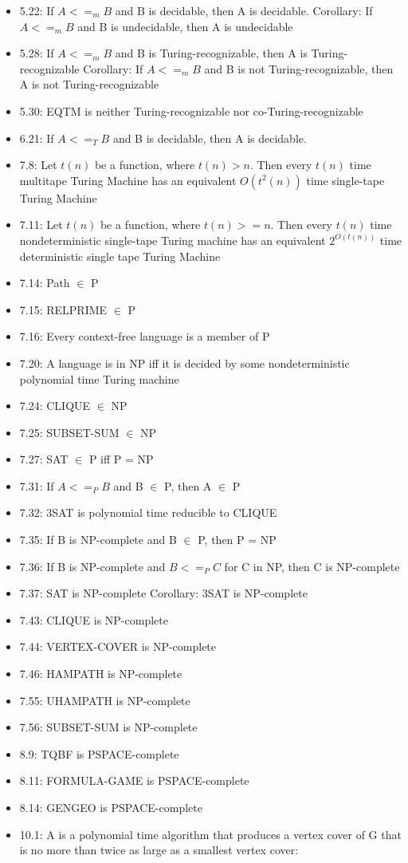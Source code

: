 \documentclass[2pt]{scrartcl}
\begin{document}
\begin{multicols}{6}
  \begin{itemize}
      \item 5.22: If $A <=_m B$ and B is decidable, then A is decidable. Corollary: If $A <=_m B$ and B is undecidable, then A is undecidable
        \item 5.28: If $A <=_m B$ and B is Turing-recognizable, then A is Turing-recognizable
Corollary: If $A <=_m B$ and B is not Turing-recognizable, then A is not Turing-recognizable
        \item 5.30: EQTM is neither Turing-recognizable nor co-Turing-recognizable
        \item 6.21: If $A <=_T B$ and B is decidable, then A is decidable.
        \item 7.8: Let $t(n)$ be a function, where $t(n) > n$. Then every $t(n)$ time multitape Turing Machine has an equivalent $O(t^2(n))$ time single-tape Turing Machine
        \item 7.11: Let $t(n)$ be a function, where $t(n) >= n$. Then every $t(n)$ time nondeterministic single-tape Turing machine has an equivalent $2^{O(t(n))}$ time deterministic single tape Turing Machine
        \item 7.14: Path $\in$ P
        \item 7.15: RELPRIME $\in$ P
        \item 7.16: Every context-free language is a member of P
        \item 7.20: A language is in NP iff it is decided by some nondeterministic polynomial time Turing machine
        \item 7.24: CLIQUE $\in$ NP 
        \item 7.25: SUBSET-SUM $\in$ NP
        \item 7.27: SAT $\in$ P iff P = NP
        \item 7.31: If $A <=_P B$ and B $\in$ P, then A $\in$ P
        \item 7.32: 3SAT is polynomial time reducible to CLIQUE
        \item 7.35: If B is NP-complete and B $\in$ P, then P = NP
        \item 7.36: If B is NP-complete and $B <=_P C$ for C in NP, then C is NP-complete
        \item 7.37: SAT is NP-complete
Corollary: 3SAT is NP-complete
        \item 7.43: CLIQUE is NP-complete
        \item 7.44: VERTEX-COVER is NP-complete
        \item 7.46: HAMPATH is NP-complete
        \item 7.55: UHAMPATH is NP-complete
        \item 7.56: SUBSET-SUM is NP-complete
        \item 8.9: TQBF is PSPACE-complete
        \item 8.11: FORMULA-GAME is PSPACE-complete
        \item 8.14: GENGEO is PSPACE-complete
        \item 10.1: A is a polynomial time algorithm that produces a vertex cover of G that is no more than twice as large as a smallest vertex cover:
        

\end{itemize}
\end{multicols}
\end{document}
